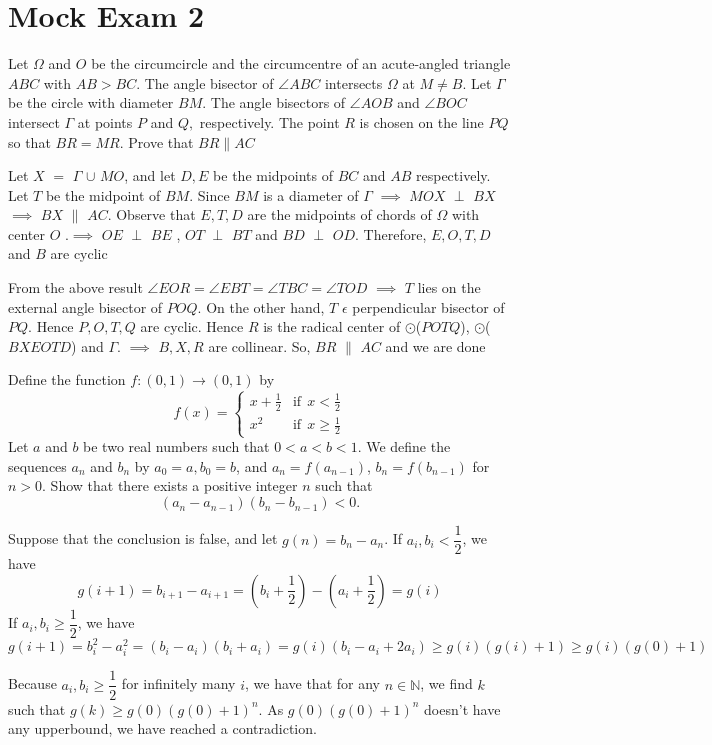 \documentclass{subfile}
\begin{document}
	\section{Mock Exam 2}
	\begin{problem}
		Let $\Omega$ and $O$ be the circumcircle and the circumcentre of an acute-angled triangle $ABC$ with $AB > BC$. The angle bisector of $\angle ABC$ intersects $\Omega$ at $M \ne B$. Let $\Gamma$ be the circle with diameter $BM$. The angle bisectors of $\angle AOB$ and $\angle BOC$ intersect $\Gamma$ at points $P$ and $Q,$ respectively. The point $R$ is chosen on the line $P Q$ so that $BR = MR$. Prove that $BR\parallel AC$
	\end{problem}
	\begin{solution}
		Let $X$ $=$ $\Gamma$ $\cup$ $MO$, and let $D,E$ be the midpoints of $BC$ and $AB$ respectively. Let $T$ be the midpoint of $BM$. Since $BM$ is a diameter of $\Gamma$ $\implies$ $MOX$ $\perp$ $BX$ $\implies$ $BX$ $\parallel$ $AC$. Observe that $E,T,D$ are the midpoints of chords of $\Omega$ with center $O$ .$\implies$ $OE$ $\perp$ $BE$ , $OT$ $\perp$ $BT$ and $BD$ $\perp$ $OD$. Therefore, $E,O,T,D$ and $B$ are cyclic 
		
		From the above result $\angle$$EOR$$=$$\angle$$EBT$$=$$\angle$$TBC$$=$$\angle$$TOD$ $\implies$ $T$ lies on the external angle bisector of $POQ$. On the other hand, $T$ $\epsilon$ perpendicular bisector of $PQ$. Hence $P,O,T,Q$ are cyclic. Hence $R$ is the radical center of $\odot$($POTQ$), $\odot$($BXEOTD$) and $\Gamma$. $\implies$ $B,X,R$ are collinear. So, $BR$ $\parallel$ $AC$ and we are done
	\end{solution}
	
	\begin{problem}
		Define the function $f:(0,1)\to (0,1)$ by \[\displaystyle f(x) = \left\{ \begin{array}{lr} x+\frac 12 & \text{if}\ \  x < \frac 12\\ x^2 & \text{if}\ \  x \ge \frac 12 \end{array} \right.\] Let $a$ and $b$ be two real numbers such that $0 < a < b < 1$. We define the sequences $a_n$ and $b_n$ by $a_0 = a, b_0 = b$, and $a_n = f( a_{n -1})$, $b_n = f (b_{n -1} )$ for $n > 0$. Show that there exists a positive integer $n$ such that \[(a_n - a_{n-1})(b_n-b_{n-1})<0.\]
	\end{problem}
	
	\begin{solution}
		Suppose that the conclusion is false, and let $g(n)=b_n-a_n$.
		If $a_i,b_i<\dfrac{1}{2}$, we have $$g(i+1)=b_{i+1}-a_{i+1}=\left (b_i+\dfrac{1}{2} \right )-\left ( a_i+\dfrac{1}{2} \right )= g(i)$$
		If $a_i,b_i\ge \dfrac{1}{2}$, we have $$g(i+1)=b_i^2-a_i^2=(b_i-a_i)(b_i+a_i)=g(i)(b_i-a_i+2a_i)\ge g(i)(g(i)+1)\ge g(i)(g(0)+1)$$
		
		Because $a_i,b_i\ge \dfrac{1}{2}$ for infinitely many $i$, we have that for any $n\in \mathbb{N}$, we find $k$ such that $g(k)\ge g(0)(g(0)+1)^n$. As $g(0)(g(0)+1)^n$ doesn't have any upperbound, we have reached a contradiction.
	\end{solution}
	
\end{document}
